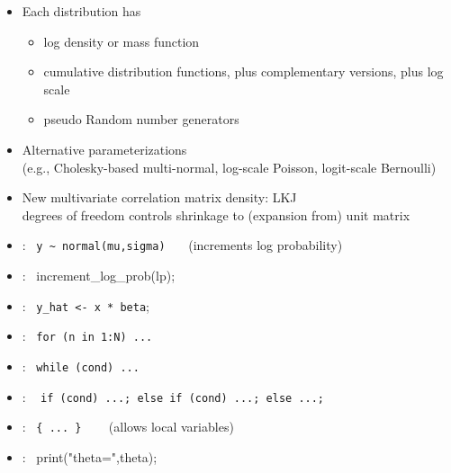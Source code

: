 \documentclass[10pt]{report}
\newcommand{\sld}[1]{\newpage{\noindent\LARGE \ \ \
    \textcolor{MidnightBlue}{\bfseries #1}}\vspace*{4pt}}
\newcommand{\code}[1]{{\tt #1}}
\newcommand{\myemph}[1]{{\color{MidnightBlue}{\bfseries #1}}}
\begin{document}
\sld{Distribution Library}

\begin{itemize}
\item Each distribution has
  \vspace*{-4pt}
  \begin{itemize}\small
  \item log density or mass function
  \item cumulative distribution functions, plus complementary versions,
    plus log scale
  \item pseudo Random number generators
  \end{itemize}
\item Alternative parameterizations
  \\
  {\footnotesize (e.g., Cholesky-based multi-normal,
    log-scale Poisson, logit-scale Bernoulli)}
\item New multivariate correlation matrix density: LKJ
  \\
  {\footnotesize degrees of freedom controls 
    shrinkage to (expansion from) unit matrix}
\end{itemize}

\sld{Statements}

\begin{itemize}
\item \myemph{Sampling}: \ {\footnotesize \Verb|y ~ normal(mu,sigma)|}
  \ \ \ {\footnotesize (increments log probability)}
\item \myemph{Log probability}: \ {\footnotesize increment\_log\_prob(lp);}
\item \myemph{Assignment}: \  {\footnotesize \code{y\_hat <- x * beta};}
\item \myemph{For loop}: \ {\footnotesize \code{for (n in 1:N) ...}}
\item \myemph{While loop}: \ {\footnotesize \code{while (cond) ...}}
\item \myemph{Conditional}: \ {\footnotesize
    \code{if (cond) ...; else if (cond) ...;  else ...;}}
\item \myemph{Block}: \ {\footnotesize \Verb|{ ... }|}  \ \ \ {\footnotesize
    (allows local variables)}
\item \myemph{Print}: \ {\footnotesize print("theta=",theta);}
\end{itemize}

\sld{Full Bayes with MCMC}
\end{document}
